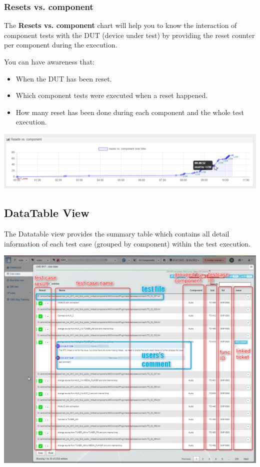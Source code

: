 \subsubsection{Resets vs. component}

The \textbf{Resets vs. component} chart will help you to know the interaction
of component tests with the DUT (device under test) by providing the reset counter
per component during the execution.

You can have awareness that:
\begin{itemize}
   \item When the DUT has been reset.
   \item Which component tests were executed when a reset happened.
   \item How many reset has been done during each component and the whole
         test execution.
\end{itemize}

\includegraphics[width=1\linewidth]
{./pictures/dashboard/reset_vs_component.png}

\hypertarget{datatable-view}{%
\subsection{DataTable View}\label{datatable-view}}

The Datatable view provides the summary table which contains all detail information
of each test case (grouped by component) within the test execution.

\includegraphics[width=1\linewidth]{./pictures/view_datatable.png}

